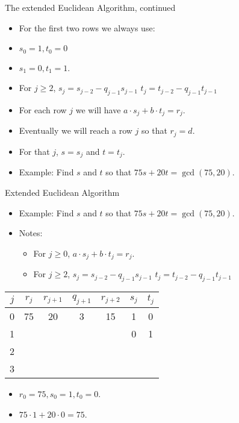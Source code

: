 \documentclass[handout]{beamer}
\begin{document}
\begin{frame}{The extended Euclidean Algorithm, continued}

\begin{itemize}
  \item For the first two rows we always use:
  \item  $s_0=1, t_0=0$
  \item  $s_1=0, t_1=1$.
  \item For $j\geq 2$, $s_j=s_{j-2} - q_{j-1}s_{j-1}$ \quad $t_j=t_{j-2} - q_{j-1}t_{j-1}$
  \item For each row $j$ we will have $a \cdot s_j + b \cdot t_j = r_j$.
  \item Eventually we will reach a row $j$ so that $r_j = d$.
  \item For that $j$, $s=s_j$ and $t=t_j$.
  \item Example: Find $s$ and $t$ so that $75s+20t = \gcd(75, 20)$.
\end{itemize}

\end{frame}

\beamerdefaultoverlayspecification{}

\begin{frame}{Extended Euclidean Algorithm}

\begin{itemize}
  \item Example: Find $s$ and $t$ so that $75s+20t = \gcd(75, 20)$.
  \item Notes:
  \begin{itemize}
    \item For $j\geq0$, $a \cdot s_j + b \cdot t_j = r_j$.
    \item For $j\geq 2$, $s_j=s_{j-2} - q_{j-1}s_{j-1}$ \quad $t_j=t_{j-2} - q_{j-1}t_{j-1}$
  \end{itemize}
\end{itemize}

\vspace{1em}

\begin{tabular}{|c|c|c|c|c|c|c|}\hline
$j$   &  $r_{j}$    & $r_{j+1}$ & $q_{j+1}$ & $r_{j+2}$ & $s_j$ & $t_j$ \\ \hline\hline
0     &  75         &  20       &    3      &   15      &  1    &   0   \\ \hline
1     &             &           &           &           &  0    &   1   \\ \hline
2     &             &           &           &           &       &       \\ \hline
3     &             &           &           &           &       &       \\ \hline
\end{tabular}

\vspace{1em}

\begin{itemize}
  \item $r_0 = 75, s_0=1, t_0=0$.
  \item $75\cdot 1 + 20 \cdot 0 = 75$.
\end{itemize}

\end{frame}
\end{document}

